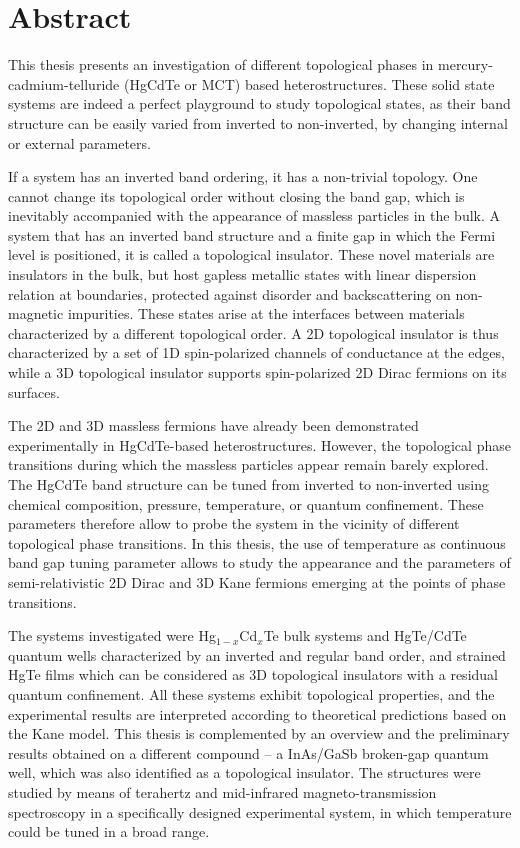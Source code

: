 \documentclass[titlepage,a4paper]{book}
\newcommand{\wciecie}{\quad\phantom{v}}
\begin{document}
\chapter*{Abstract}
\wciecie
This thesis presents an investigation of different topological phases in mercury-cadmium-telluride (HgCdTe or MCT) based heterostructures. These solid state systems are indeed a perfect playground to study topological states, as their band structure can be easily varied from inverted to non-inverted, by changing internal or external parameters. 

If a system has an inverted band ordering, it has a non-trivial topology. One cannot change its topological order without closing the band gap, which is inevitably accompanied with the appearance of massless particles in the bulk. A system that has an inverted band structure and a finite gap in which the Fermi level is positioned, it is called a topological insulator. These novel materials are insulators in the bulk, but host gapless metallic states with linear dispersion relation at boundaries, protected against disorder and backscattering on non-magnetic impurities. These states arise at the interfaces between materials characterized by a different topological order. A 2D topological insulator is thus characterized by a set of 1D spin-polarized channels of conductance at the edges, while a 3D topological insulator supports spin-polarized 2D Dirac fermions on its surfaces.
 
The 2D and 3D massless fermions have already been demonstrated experimentally in HgCdTe-based heterostructures. However, the topological phase transitions during which the massless particles appear remain barely explored. The HgCdTe band structure can be tuned from inverted to non-inverted using chemical composition, pressure, temperature, or quantum confinement. These parameters therefore allow to probe the system in the vicinity of different topological phase transitions. In this thesis, the use of temperature as continuous band gap tuning parameter allows to study the appearance and the parameters of semi-relativistic 2D Dirac and 3D Kane fermions emerging at the points of phase transitions.
 
The systems investigated were Hg$_{1-x}$Cd$_x$Te bulk systems and HgTe/CdTe quantum wells characterized by an inverted and regular band order, and strained HgTe films which can be considered as 3D topological insulators with a residual quantum confinement. All these systems exhibit topological properties, and the experimental results are interpreted according to theoretical predictions based on the Kane model. This thesis is complemented by an overview and the preliminary results obtained on a different compound -- a InAs/GaSb broken-gap quantum well, which was also identified as a topological insulator. The structures were studied by means of terahertz and mid-infrared magneto-transmission spectroscopy in a specifically designed experimental system, in which temperature could be tuned in a broad range. 
\end{document}

